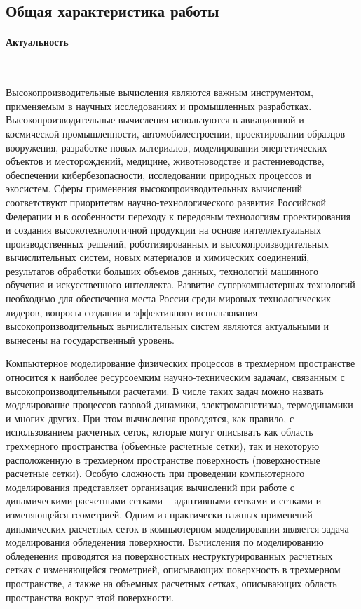 \documentclass[a4paper,14pt]{extarticle}                     %
\theoremstyle{plain}                                         %
\begin{document}
\newpage
\subsection*{Общая характеристика работы}

\paragraph{Актуальность} \

Высокопроизводительные вычисления являются важным инструментом, применяемым в научных исследованиях и промышленных разработках.
Высокопроизводительные вычисления используются в авиационной и космической промышленности, автомобилестроении, проектировании образцов вооружения, разработке новых материалов, моделировании энергетических объектов и месторождений, медицине, животноводстве и растениеводстве, обеспечении кибербезопасности, исследовании природных процессов и экосистем.
Сферы применения высокопроизводительных вычислений соответствуют приоритетам научно-технологического развития Российской Федерации и в особенности переходу к передовым технологиям проектирования и создания высокотехнологичной продукции на основе интеллектуальных производственных решений, роботизированных и высокопроизводительных вычислительных систем, новых материалов и химических соединений, результатов обработки больших объемов данных, технологий машинного обучения и искусственного интеллекта.
Развитие суперкомпьютерных технологий необходимо для обеспечения места России среди мировых технологических лидеров, вопросы создания и эффективного использования высокопроизводительных вычислительных систем являются актуальными и вынесены на государственный уровень.

Компьютерное моделирование физических процессов в трехмерном пространстве относится к наиболее ресурсоемким научно-техническим задачам, связанным с высокопроизводительными расчетами.
В числе таких задач можно назвать моделирование процессов газовой динамики, электромагнетизма, термодинамики и многих других.
При этом вычисления проводятся, как правило, с использованием расчетных сеток, которые могут описывать как область трехмерного пространства (объемные расчетные сетки), так и некоторую расположенную в трехмерном пространстве поверхность (поверхностные расчетные сетки).
Особую сложность при проведении компьютерного моделирования представляет организация вычислений при работе с динамическими расчетными сетками -- адаптивными сетками и сетками и изменяющейся геометрией.
Одним из практически важных применений динамических расчетных сеток в компьютерном моделировании является задача моделирования обледенения поверхности.
Вычисления по моделированию обледенения проводятся на поверхностных неструктурированных расчетных сетках с изменяющейся геометрией, описывающих поверхность в трехмерном пространстве, а также на объемных расчетных сетках, описывающих область пространства вокруг этой поверхности.
\end{document}
